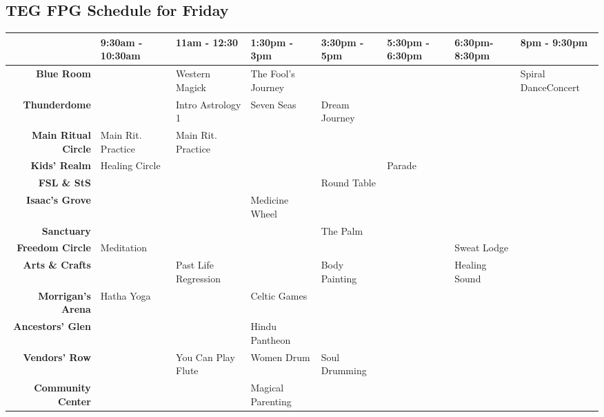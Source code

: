 
 \begin{center}
\section{TEG FPG Schedule for Friday}

\begin{tabular}{|r|l|l|l|l|l|l|l|}
\hline
 & \textbf{9:30am - 10:30am} & \textbf{11am - 12:30} & \textbf{1:30pm - 3pm} & \textbf{3:30pm - 5pm} & \textbf{5:30pm - 6:30pm} & \textbf{6:30pm-8:30pm} & \textbf{8pm - 9:30pm} \\
\hline
\textbf{Blue Room} &  & Western Magick & The Fool's Journey &  &  &  & Spiral DanceConcert \\
\hline
\textbf{Thunderdome} &  & Intro Astrology 1 & Seven Seas & Dream Journey &  &  &  \\
\hline
\textbf{Main Ritual Circle} & Main Rit. Practice & Main Rit. Practice &  &  &  &  &  \\
\hline
\textbf{Kids' Realm} & Healing Circle &  &  &  & Parade &  &  \\
\hline
\textbf{FSL \& StS} &  &  &  & Round Table &  &  &  \\
\hline
\textbf{Isaac's Grove} &  &  & Medicine Wheel &  &  &  &  \\
\hline
\textbf{Sanctuary} &  &  &  & The Palm &  &  &  \\
\hline
\textbf{Freedom Circle} & Meditation &  &  &  &  & Sweat Lodge &  \\
\hline
\textbf{Arts \& Crafts} &  & Past Life Regression &  & Body Painting &  & Healing Sound &  \\
\hline
\textbf{Morrigan's Arena} & Hatha Yoga &  & Celtic Games &  &  &  &  \\
\hline
\textbf{Ancestors' Glen} &  &  & Hindu Pantheon &  &  &  &  \\
\hline
\textbf{Vendors' Row} &  & You Can Play Flute & Women Drum & Soul Drumming &  &  &  \\
\hline
\textbf{Community Center} &  &  & Magical Parenting &  &  &  &  \\
\hline
\end{tabular}
\end{center}